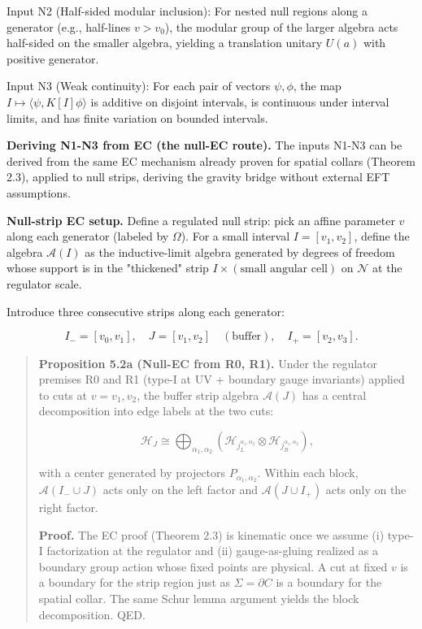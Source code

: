 Input N2 (Half-sided modular inclusion): For nested null regions along a generator (e.g., half-lines \(v > v_0\)), the modular group of the larger algebra acts half-sided on the smaller algebra, yielding a translation unitary \(U(a)\) with positive generator.

Input N3 (Weak continuity): For each pair of vectors \(\psi,\phi\), the map \(I \mapsto \langle \psi, K[I] \phi \rangle\) is additive on disjoint intervals, is continuous under interval limits, and has finite variation on bounded intervals.

\textbf{Deriving N1-N3 from EC (the null-EC route).} The inputs N1-N3 can be derived from the same EC mechanism already proven for spatial collars (Theorem 2.3), applied to null strips, deriving the gravity bridge without external EFT assumptions.

\textbf{Null-strip EC setup.} Define a regulated null strip: pick an affine parameter \(v\) along each generator (labeled by \(\Omega\)). For a small interval \(I = [v_1, v_2]\), define the algebra \(\mathcal{A}(I)\) as the inductive-limit algebra generated by degrees of freedom whose support is in the "thickened" strip \(I \times (\text{small angular cell})\) on \(\mathcal{N}\) at the regulator scale.

Introduce three consecutive strips along each generator:

\[
I_- = [v_0, v_1], \quad J = [v_1, v_2] \quad (\text{buffer}), \quad
I_+ = [v_2, v_3].
\]

\begin{quote}
\textbf{Proposition 5.2a (Null-EC from R0, R1).} Under the regulator premises R0 and R1 (type-I at UV + boundary gauge invariants) applied to cuts at \(v = v_1, v_2\), the buffer strip algebra \(\mathcal{A}(J)\) has a central decomposition into edge labels at the two cuts:

\[
\mathcal{H}_J \cong \bigoplus_{\alpha_1, \alpha_2}
\left(\mathcal{H}_{j_L^{\alpha_1, \alpha_2}} \otimes
\mathcal{H}_{j_R^{\alpha_1, \alpha_2}}\right),
\]

with a center generated by projectors \(P_{\alpha_1, \alpha_2}\). Within each block, \(\mathcal{A}(I_- \cup J)\) acts only on the left factor and \(\mathcal{A}(J \cup I_+)\) acts only on the right factor.

\textbf{Proof.} The EC proof (Theorem 2.3) is kinematic once we assume (i) type-I factorization at the regulator and (ii) gauge-as-gluing realized as a boundary group action whose fixed points are physical. A cut at fixed \(v\) is a boundary for the strip region just as \(\Sigma = \partial C\) is a boundary for the spatial collar. The same Schur lemma argument yields the block decomposition. QED.
\end{quote}

